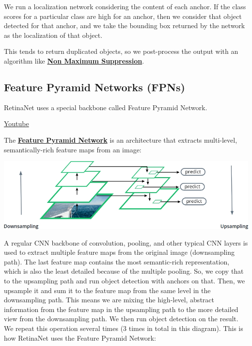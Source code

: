 We run a localization network considering the content of each anchor. If the class scores for a particular class are high for an anchor, then we consider that object detected for that anchor, and we take the bounding box returned by the network as the localization of that object. \newline

This tends to return duplicated objects, so we post-process the output with an algorithm like \href{https://learnopencv.com/non-maximum-suppression-theory-and-implementation-in-pytorch/}{\textbf{Non Maximum Suppression}}.

\subsection{Feature Pyramid Networks (FPNs)}

RetinaNet uses a special backbone called Feature Pyramid Network. \newline

\href{https://www.youtube.com/watch?v=xV-0rtuuStE&ab_channel=Udacity}{Youtube} \newline

The \href{https://arxiv.org/abs/1612.03144}{\textbf{Feature Pyramid Network}} is an architecture that extracts multi-level, semantically-rich feature maps from an image:

\includegraphics[width=1\linewidth]{img//cnn//depth/fpn.jpeg}

A regular CNN backbone of convolution, pooling, and other typical CNN layers is used to extract multiple feature maps from the original image (downsampling path). The last feature map contains the most semantic-rich representation, which is also the least detailed because of the multiple pooling. So, we copy that to the upsampling path and run object detection with anchors on that. Then, we upsample it and sum it to the feature map from the same level in the downsampling path. This means we are mixing the high-level, abstract information from the feature map in the upsampling path to the more detailed view from the downsampling path. We then run object detection on the result. We repeat this operation several times (3 times in total in this diagram). This is how RetinaNet uses the Feature Pyramid Network:


